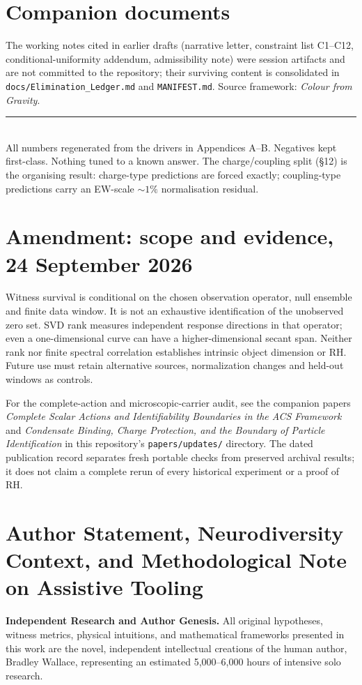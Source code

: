 \documentclass[11pt]{article}
\begin{document}
\section{Companion documents}
The working notes cited in earlier drafts (narrative letter, constraint list
C1--C12, conditional-uniformity addendum, admissibility note) were session
artifacts and are not committed to the repository; their surviving content is
consolidated in \nolinkurl{docs/Elimination_Ledger.md} and \texttt{MANIFEST.md}.
Source framework: \emph{Colour from Gravity}.

\vspace{1em}
\noindent\rule{\textwidth}{0.4pt}\\
\small All numbers regenerated from the drivers in Appendices A--B. Negatives kept first-class. Nothing tuned to a known answer. The charge/coupling split (\S12) is the organising result: charge-type predictions are forced exactly; coupling-type predictions carry an EW-scale $\sim1\%$ normalisation residual.


\section*{Amendment: scope and evidence, 24 September 2026}
Witness survival is conditional on the chosen observation operator, null ensemble and finite data window. It is not an exhaustive identification of the unobserved zero set. SVD rank measures independent response directions in that operator; even a one-dimensional curve can have a higher-dimensional secant span. Neither rank nor finite spectral correlation establishes intrinsic object dimension or RH. Future use must retain alternative sources, normalization changes and held-out windows as controls.

For the complete-action and microscopic-carrier audit, see the companion
papers \emph{Complete Scalar Actions and Identifiability Boundaries in the ACS
Framework} and \emph{Condensate Binding, Charge Protection, and the Boundary
of Particle Identification} in this repository's \texttt{papers/updates/}
directory. The dated publication record separates fresh portable checks
from preserved archival results; it does not claim a complete rerun of every
historical experiment or a proof of RH.

\section*{Author Statement, Neurodiversity Context, and Methodological Note on Assistive Tooling}
\noindent\textbf{Independent Research and Author Genesis.} 
All original hypotheses, witness metrics, physical intuitions, and mathematical frameworks presented in this work are the novel, independent intellectual creations of the human author, Bradley Wallace, representing an estimated 5,000--6,000 hours of intensive solo research.
\end{document}
